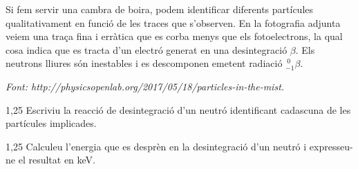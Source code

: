 Si fem servir una cambra de boira, podem identificar diferents partícules qualitativament en funció de les traces que s'observen. En la fotografia adjunta veiem una traça fina i erràtica que es corba menys que els fotoelectrons, la qual cosa indica que es tracta d'un electró generat en una desintegració $\beta$. Els neutrons lliures són inestables i es descomponen emetent radiació $^{\ 0}_{-1}\beta$.


\textit{Font: http://physicsopenlab.org/2017/05/18/particles-in-the-mist.}

\begin{apartat}{1,25}
Escriviu la reacció de desintegració d'un neutró identificant cadascuna de les partícules implicades.
\end{apartat}

\begin{apartat}{1,25}
Calculeu l'energia que es desprèn en la desintegració d'un neutró i expresseu-ne el resultat en keV.
\end{apartat}

